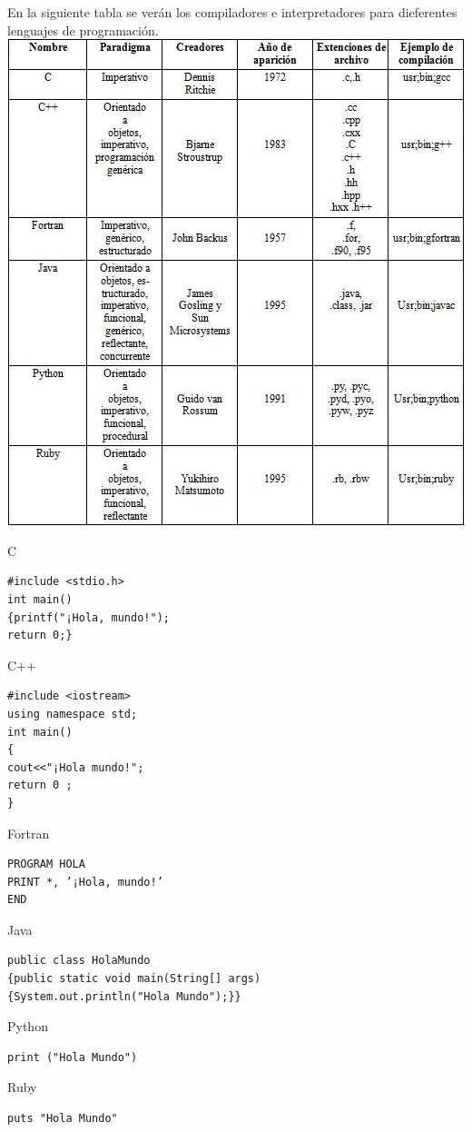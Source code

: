 
 

\pagestyle{empty} %

\titleGP %
\newpage

En la siguiente tabla se ver\'an los compiladores e interpretadores para dieferentes lenguajes de programaci\'on. \linebreak \linebreak
{\includegraphics[width=1\textwidth]{123.jpg}}

C
\begin{verbatim}
#include <stdio.h>
int main()
{printf("¡Hola, mundo!");
return 0;}
\end{verbatim}

C++
\begin{verbatim}
#include <iostream>
using namespace std;
int main()
{
cout<<"¡Hola mundo!";
return 0 ;
}
\end{verbatim}


Fortran
\begin{verbatim}
PROGRAM HOLA
PRINT *, ’¡Hola, mundo!’
END
\end{verbatim}
Java
\begin{verbatim}
public class HolaMundo
{public static void main(String[] args)
{System.out.println("Hola Mundo");}}
\end{verbatim}


Python
\begin{verbatim}
print ("Hola Mundo")
\end{verbatim}

Ruby
\begin{verbatim}
puts "Hola Mundo"
\end{verbatim}


